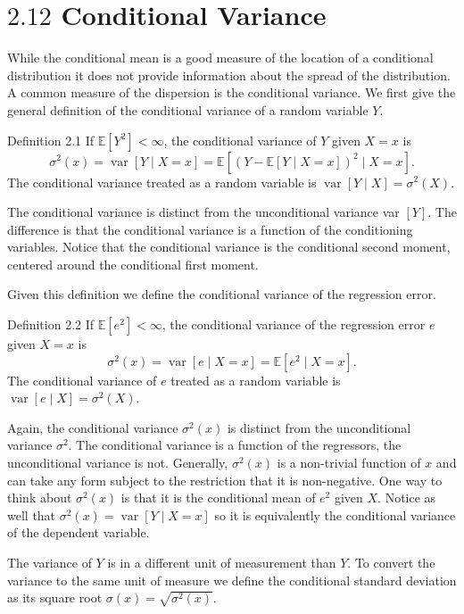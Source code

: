 \documentclass[10pt]{article}
\begin{document}
\section{$2.12$ Conditional Variance}
While the conditional mean is a good measure of the location of a conditional distribution it does not provide information about the spread of the distribution. A common measure of the dispersion is the conditional variance. We first give the general definition of the conditional variance of a random variable $Y$.

Definition 2.1 If $\mathbb{E}\left[Y^{2}\right]<\infty$, the conditional variance of $Y$ given $X=x$ is
$$
\sigma^{2}(x)=\operatorname{var}[Y \mid X=x]=\mathbb{E}\left[(Y-\mathbb{E}[Y \mid X=x])^{2} \mid X=x\right] .
$$
The conditional variance treated as a random variable is $\operatorname{var}[Y \mid X]=\sigma^{2}(X)$.

The conditional variance is distinct from the unconditional variance var $[Y]$. The difference is that the conditional variance is a function of the conditioning variables. Notice that the conditional variance is the conditional second moment, centered around the conditional first moment.

Given this definition we define the conditional variance of the regression error.

Definition 2.2 If $\mathbb{E}\left[e^{2}\right]<\infty$, the conditional variance of the regression error $e$ given $X=x$ is
$$
\sigma^{2}(x)=\operatorname{var}[e \mid X=x]=\mathbb{E}\left[e^{2} \mid X=x\right] .
$$
The conditional variance of $e$ treated as a random variable is $\operatorname{var}[e \mid X]=\sigma^{2}(X)$.

Again, the conditional variance $\sigma^{2}(x)$ is distinct from the unconditional variance $\sigma^{2}$. The conditional variance is a function of the regressors, the unconditional variance is not. Generally, $\sigma^{2}(x)$ is a non-trivial function of $x$ and can take any form subject to the restriction that it is non-negative. One way to think about $\sigma^{2}(x)$ is that it is the conditional mean of $e^{2}$ given $X$. Notice as well that $\sigma^{2}(x)=\operatorname{var}[Y \mid X=x]$ so it is equivalently the conditional variance of the dependent variable.

The variance of $Y$ is in a different unit of measurement than $Y$. To convert the variance to the same unit of measure we define the conditional standard deviation as its square root $\sigma(x)=\sqrt{\sigma^{2}(x)}$.
\end{document}

